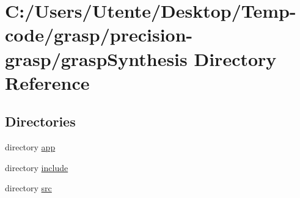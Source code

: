 \section{C\+:/\+Users/\+Utente/\+Desktop/\+Temp-\/code/grasp/precision-\/grasp/grasp\+Synthesis Directory Reference}
\label{dir_250bb180ed40927d0f5c08cd48ecf7d2}
\subsection*{Directories}
\begin{DoxyCompactItemize}
\item 
directory \hyperlink{dir_361d6f54a249a0704f3edbbd851792f7}{app}
\item 
directory \hyperlink{dir_0c18a7b6a7fcb6256ca384888c844825}{include}
\item 
directory \hyperlink{dir_93bb1b7d481c79442225c7635cbc7aeb}{src}
\end{DoxyCompactItemize}

